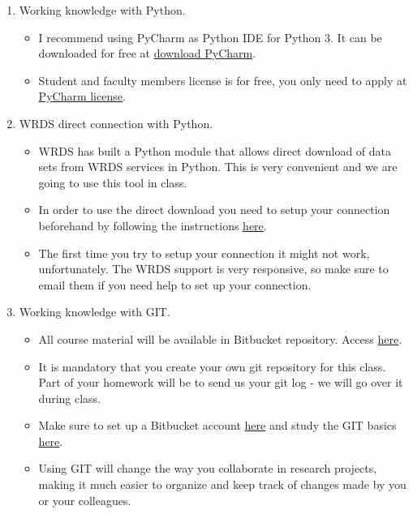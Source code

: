\documentclass[12pts]{article}
\begin{document}
\begin{enumerate}
	\item Working knowledge with Python.
	\begin{itemize}
		\item I recommend using PyCharm as Python IDE for Python 3. It can be downloaded for free at \href{https://www.jetbrains.com/pycharm/download/#section=windows}{download PyCharm}.
		\item Student and faculty members license is for free, you only need to apply at \href{https://www.jetbrains.com/student/}{PyCharm license}. 
	\end{itemize}
    \item WRDS direct connection with Python.
    \begin{itemize}
    	\item WRDS has built a Python module that allows direct download of data sets from WRDS services in Python. This is very convenient and we are going to use this tool in class.
    	\item In order to use the direct download you need to setup your connection beforehand by following the instructions \href{https://wrds-www.wharton.upenn.edu/pages/support/programming-wrds/programming-python/python-from-your-computer/}{here}.  
    	\item The first time you try to setup your connection it might not work, unfortunately. The WRDS support is very responsive, so make sure to email them if you need help to set up your connection. 
    \end{itemize}
   \item Working knowledge with GIT.
	\begin{itemize}
		\item All course material will be available in Bitbucket repository. Access \href{https://bitbucket.org/liramota/big_data2020/src}{here}.
		\item It is mandatory that you create your own git repository for this class. Part of your homework will be to send us your git log - we will go over it during class.
		\item Make sure to set up a Bitbucket account \href{https://bitbucket.org/account/signup/}{here} and study the GIT basics \href{https://www.atlassian.com/git/tutorials/what-is-version-control}{here}.
		\item Using GIT will change the way you collaborate in research projects, making it much easier to organize and keep track of changes made by you or your colleagues.
	\end{itemize}

\end{enumerate}
\end{document}
